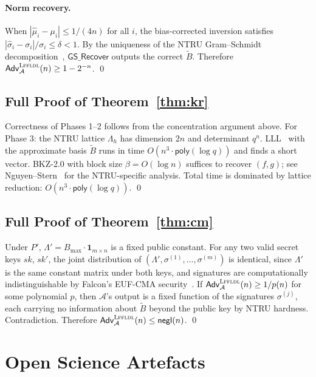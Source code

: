 \documentclass[sigconf,anonymous]{acmart}
\begin{document}
\paragraph{Norm recovery.}
When $|\hat{\mu}_i-\mu_i|\le 1/(4n)$ for all $i$, the bias-corrected
inversion satisfies $|\hat{\sigma}_i-\sigma_i|/\sigma_i\le\delta<1$.
By the uniqueness of the NTRU Gram--Schmidt decomposition~\cite{ducas2016falcon},
$\mathsf{GS\_Recover}$ outputs the correct $\widetilde{B}$.
Therefore $\mathsf{Adv}^{\textsc{Lffldl}}_{\mathcal{A}}(n)\ge 1-2^{-n}$. \qed

\subsection{Full Proof of Theorem~\ref{thm:kr}}

Correctness of Phases 1--2 follows from the concentration argument above.
For Phase 3: the NTRU lattice $\Lambda_h$ has dimension $2n$ and determinant
$q^n$.  LLL~\cite{lll1982} with the approximate basis $\widetilde{B}$ runs in
time $O(n^3\cdot\mathsf{poly}(\log q))$ and finds a short vector.  BKZ-2.0
with block size $\beta = O(\log n)$ suffices to recover $(f,g)$; see
Nguyen--Stern~\cite{nguyenstern} for the NTRU-specific analysis.
Total time is dominated by lattice reduction: $O(n^3\cdot\mathsf{poly}(\log q))$.
\qed

\subsection{Full Proof of Theorem~\ref{thm:cm}}

Under $P'$, $\Lambda' = B_{\max}\cdot\mathbf{1}_{m\times n}$ is a fixed public
constant.  For any two valid secret keys $sk$, $sk'$, the joint distribution
of $(\Lambda',\sigma^{(1)},\ldots,\sigma^{(m)})$ is identical, since $\Lambda'$
is the same constant matrix under both keys, and signatures are computationally
indistinguishable by Falcon's EUF-CMA security~\cite{falcon2020}.
If $\mathsf{Adv}^{\textsc{Lffldl}}_{\mathcal{A}}(n)\ge 1/p(n)$ for some
polynomial $p$, then $\mathcal{A}$'s output is a fixed function of the
signatures $\sigma^{(j)}$, each carrying no information about $\widetilde{B}$
beyond the public key by NTRU hardness.  Contradiction.
Therefore $\mathsf{Adv}^{\textsc{Lffldl}}_{\mathcal{A}}(n)\le\mathsf{negl}(n)$.
\qed

\section{Open Science Artefacts}
\end{document}
